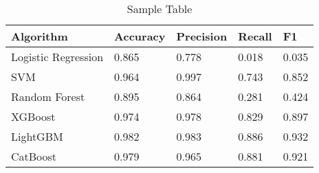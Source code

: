 
\begin{table*}[!ht]
    \centering
    \begin{tabular}{|l|l|l|l|l|}
    \hline
    Algorithm  & Accuracy & Precision & Recall & F1\\ \hline

     Logistic Regression & 0.865    & 0.778  & 0.018  & 0.035    \\
     SVM                 & 0.964    & 0.997  & 0.743  & 0.852    \\
     Random Forest       & 0.895    & 0.864  & 0.281  & 0.424    \\
     XGBoost             & 0.974    & 0.978  & 0.829  & 0.897    \\
     LightGBM            & 0.982    & 0.983  & 0.886  & 0.932    \\
     CatBoost            & 0.979    & 0.965  & 0.881  & 0.921    \\
    \hline    

    \hline
    \end{tabular}
    \caption{Sample Table}
    \label{tab:sample_table}
\end{table*}
